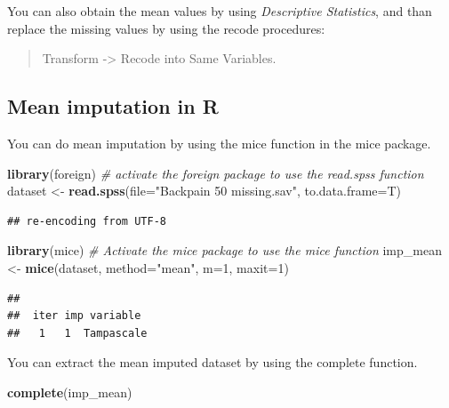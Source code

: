 \documentclass[]{book}
\newenvironment{Shaded}{\begin{snugshade}}{\end{snugshade}}
\newcommand{\KeywordTok}[1]{\textcolor[rgb]{0.13,0.29,0.53}{\textbf{#1}}}
\newcommand{\DataTypeTok}[1]{\textcolor[rgb]{0.13,0.29,0.53}{#1}}
\newcommand{\DecValTok}[1]{\textcolor[rgb]{0.00,0.00,0.81}{#1}}
\newcommand{\StringTok}[1]{\textcolor[rgb]{0.31,0.60,0.02}{#1}}
\newcommand{\CommentTok}[1]{\textcolor[rgb]{0.56,0.35,0.01}{\textit{#1}}}
\newcommand{\NormalTok}[1]{#1}
\theoremstyle{definition}
\theoremstyle{definition}
\theoremstyle{definition}
\theoremstyle{remark}
\begin{document}
You can also obtain the mean values by using \emph{Descriptive
Statistics}, and than replace the missing values by using the recode
procedures:

\begin{quote}
Transform -\textgreater{} Recode into Same Variables.
\end{quote}

\subsection{Mean imputation in R}\label{mean-imputation-in-r}

You can do mean imputation by using the mice function in the mice
package.

\begin{Shaded}
\begin{Highlighting}[]
\KeywordTok{library}\NormalTok{(foreign) }\CommentTok{# activate the foreign package to use the read.spss function}
\NormalTok{dataset <-}\StringTok{ }\KeywordTok{read.spss}\NormalTok{(}\DataTypeTok{file=}\StringTok{"Backpain 50 missing.sav"}\NormalTok{, }\DataTypeTok{to.data.frame=}\NormalTok{T)}
\end{Highlighting}
\end{Shaded}

\begin{verbatim}
## re-encoding from UTF-8
\end{verbatim}

\begin{Shaded}
\begin{Highlighting}[]
\KeywordTok{library}\NormalTok{(mice) }\CommentTok{# Activate the mice package to use the mice function}
\NormalTok{imp_mean <-}\StringTok{ }\KeywordTok{mice}\NormalTok{(dataset, }\DataTypeTok{method=}\StringTok{"mean"}\NormalTok{, }\DataTypeTok{m=}\DecValTok{1}\NormalTok{, }\DataTypeTok{maxit=}\DecValTok{1}\NormalTok{)}
\end{Highlighting}
\end{Shaded}

\begin{verbatim}
## 
##  iter imp variable
##   1   1  Tampascale
\end{verbatim}

You can extract the mean imputed dataset by using the complete function.

\begin{Shaded}
\begin{Highlighting}[]
\KeywordTok{complete}\NormalTok{(imp_mean)}
\end{Highlighting}
\end{Shaded}
\end{document}
